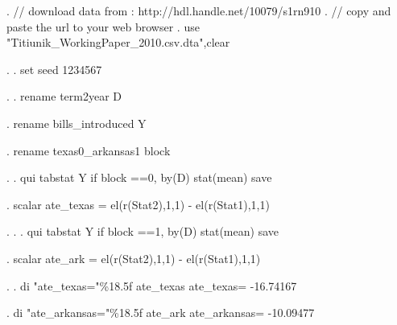 . // download data from : http://hdl.handle.net/10079/s1rn910
. // copy and paste the url to your web browser
. use "Titiunik_WorkingPaper_2010.csv.dta",clear 

. 
. set seed 1234567

. 
.         rename term2year D

.         rename bills_introduced Y

.         rename texas0_arkansas1 block

.         
.         qui tabstat Y if block ==0, by(D) stat(mean) save       

.         scalar ate_texas = el(r(Stat2),1,1) - el(r(Stat1),1,1)

. 
.         
.         qui tabstat Y if block ==1, by(D) stat(mean) save       

.         scalar ate_ark = el(r(Stat2),1,1) - el(r(Stat1),1,1)

.         
.         di "ate_texas="\%18.5f ate_texas 
ate_texas=         -16.74167

.         di "ate_arkansas="\%18.5f ate_ark        
ate_arkansas=         -10.09477

